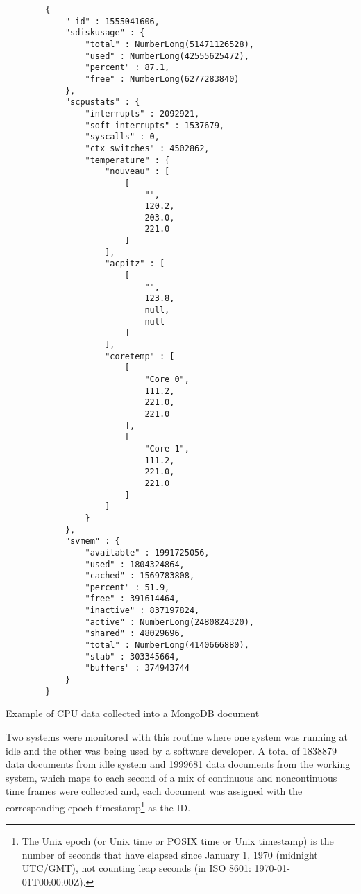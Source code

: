 \begin{code}
    \begin{verbatim}
        {
            "_id" : 1555041606,
            "sdiskusage" : {
                "total" : NumberLong(51471126528),
                "used" : NumberLong(42555625472),
                "percent" : 87.1,
                "free" : NumberLong(6277283840)
            },
            "scpustats" : {
                "interrupts" : 2092921,
                "soft_interrupts" : 1537679,
                "syscalls" : 0,
                "ctx_switches" : 4502862,
                "temperature" : {
                    "nouveau" : [ 
                        [ 
                            "", 
                            120.2, 
                            203.0, 
                            221.0
                        ]
                    ],
                    "acpitz" : [ 
                        [ 
                            "", 
                            123.8, 
                            null, 
                            null
                        ]
                    ],
                    "coretemp" : [ 
                        [ 
                            "Core 0", 
                            111.2, 
                            221.0, 
                            221.0
                        ], 
                        [ 
                            "Core 1", 
                            111.2, 
                            221.0, 
                            221.0
                        ]
                    ]
                }
            },
            "svmem" : {
                "available" : 1991725056,
                "used" : 1804324864,
                "cached" : 1569783808,
                "percent" : 51.9,
                "free" : 391614464,
                "inactive" : 837197824,
                "active" : NumberLong(2480824320),
                "shared" : 48029696,
                "total" : NumberLong(4140666880),
                "slab" : 303345664,
                "buffers" : 374943744
            }
        }
    \end{verbatim}
    \caption{Example of CPU data collected into a MongoDB document}
    \label{lst:samp_cpu_dat}
\end{code}

Two systems were monitored with this routine where one system was running at idle and the other was being used by a software developer. A total of 1838879 data documents from idle system and 1999681 data documents from the working system, which maps to each second of a mix of continuous and noncontinuous time frames were collected and, each document was assigned with the corresponding epoch timestamp\footnote{The Unix epoch (or Unix time or POSIX time or Unix timestamp) is the number of seconds that have elapsed since January 1, 1970 (midnight UTC/GMT), not counting leap seconds (in ISO 8601: 1970-01-01T00:00:00Z).\cite{web_epoch_def}} as the ID.

